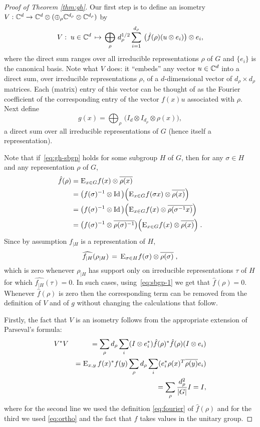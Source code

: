 \begin{proof}[Proof of Theorem \ref{thm:gh}]
Our first step is to define an isometry $V:\mathbb{C}^d \to \mathbb{C}^d \otimes (\oplus_\rho \mathbb{C}^{d_\rho} \otimes \mathbb{C}^{d_\rho})$ by
$$ V :\;u \in \mathbb{C}^d \,\mapsto\, \bigoplus_\rho \,d_\rho^{1/2} \sum_{i=1}^{d_\rho} \,\big(\hat{f}(\rho) (u\otimes e_i)\big) \otimes e_i,$$
where the direct sum ranges over all irreducible representations $\rho$ of $G$ and $\{e_i\}$ is the canonical basis. 
Note what $V$ does: it ``embeds'' any vector $u\in \mathbb{C}^d$ into a direct sum, over irreducible representations $\rho$, of a $d$-dimensional vector of $d_\rho\times d_\rho$ matrices. Each (matrix) entry of this vector can be thought of as the Fourier coefficient of the corresponding entry of the vector $f(x)u$ associated with $\rho$. Next define 
$$g(x) = \bigoplus_\rho \,\big(I_d \otimes I_{d_\rho} \otimes \rho(x)\big), $$
a direct sum over all irreducible representations of $G$ (hence itself a representation). 

Note that if~\eqref{eq:gh-sbgp} holds for some subgroup $H$ of $G$, then for any $\sigma \in H$ and any representation $\rho$ of $G$,
\begin{align}
\hat{f}(\rho) &= \textsc{E}_{x\in G} f(x)\otimes \overline{\rho(x)}\notag\\
&= \big(f(\sigma)^{-1} \otimes \mathop{\rm Id}\nolimits\big)\Big(\textsc{E}_{x\in G} f(\sigma x)\otimes \overline{\rho(x)}\Big)\notag\\
&= \big(f(\sigma)^{-1} \otimes \mathop{\rm Id}\nolimits\big)\Big(\textsc{E}_{x\in G} f(x)\otimes \overline{\rho(\sigma^{-1} x)}\Big)\notag\\
&= \big(f(\sigma)^{-1} \otimes \overline{\rho(\sigma)^{-1}}\big)\Big( \textsc{E}_{x\in G} f(x)\otimes \overline{\rho( x)}\Big)\;.\label{eq:sbgp-1}
\end{align}
Since by assumption $f_{|H}$ is a representation of $H$, 
\[\widehat{f_{|H}}(\rho_{|H}) \,=\,\textsc{E}_{\sigma\in H} f(\sigma)\otimes \overline{\rho(\sigma)}\;, \]
which is zero whenever $\rho_{|H}$ has support only on irreducible representations $\tau$ of $H$ for which $ \widehat{f_{|H}}(\tau)=0$. In such cases, using~\eqref{eq:sbgp-1} we get that $\hat{f}(\rho)=0$. Whenever $\hat{f}(\rho)$ is zero then the corresponding term can be removed from the definition of $V$ and of $g$ without changing the calculations that follow. 

Firstly, the fact that $V$ is an isometry follows from the appropriate extension of Parseval's formula:  
\begin{eqnarray*}
& V^* V &= \sum_\rho d_\rho \sum_i (I\otimes e_i^*) \hat{f}(\rho)^*\hat{f}(\rho) (I\otimes e_i)\\
&&= \textsc{E}_{x,y}\,  f(x)^*f(y) \sum_\rho d_\rho \sum_i  (e_i^* \rho(x)^T \overline{\rho(y)} e_i)\\
&&= \sum_\rho \frac{d_\rho^2}{|G|}I = I,
\end{eqnarray*}
where for the second line we used the definition \eqref{eq:fourier} of $\hat{f}(\rho)$ and  for the third we used \eqref{eq:ortho} and the fact that $f$ takes values in the unitary group.


\end{proof}
